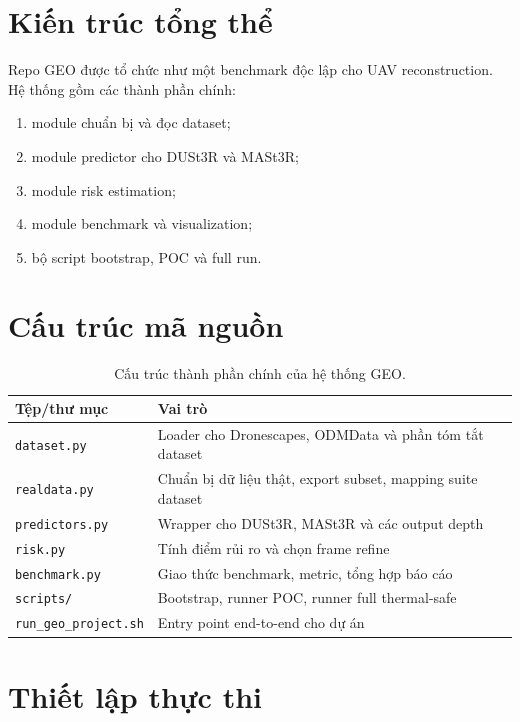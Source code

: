 \documentclass[../DoAn.tex]{subfiles}
\begin{document}
\section{Kiến trúc tổng thể}

Repo GEO được tổ chức như một benchmark độc lập cho UAV reconstruction. Hệ thống gồm các thành phần chính:
\begin{enumerate}[leftmargin=1.5em]
  \item module chuẩn bị và đọc dataset;
  \item module predictor cho DUSt3R và MASt3R;
  \item module risk estimation;
  \item module benchmark và visualization;
  \item bộ script bootstrap, POC và full run.
\end{enumerate}

\section{Cấu trúc mã nguồn}

\begin{table}[t]
\centering
\small
\begin{tabularx}{\textwidth}{>{\raggedright\arraybackslash}p{4cm} X}
\toprule
\textbf{Tệp/thư mục} & \textbf{Vai trò} \\
\midrule
\texttt{dataset.py} & Loader cho Dronescapes, ODMData và phần tóm tắt dataset \\
\texttt{realdata.py} & Chuẩn bị dữ liệu thật, export subset, mapping suite dataset \\
\texttt{predictors.py} & Wrapper cho DUSt3R, MASt3R và các output depth \\
\texttt{risk.py} & Tính điểm rủi ro và chọn frame refine \\
\texttt{benchmark.py} & Giao thức benchmark, metric, tổng hợp báo cáo \\
\texttt{scripts/} & Bootstrap, runner POC, runner full thermal-safe \\
\texttt{run\_geo\_project.sh} & Entry point end-to-end cho dự án \\
\bottomrule
\end{tabularx}
\caption{Cấu trúc thành phần chính của hệ thống GEO.}
\label{tab:repo-structure}
\end{table}

\section{Thiết lập thực thi}
\end{document}
